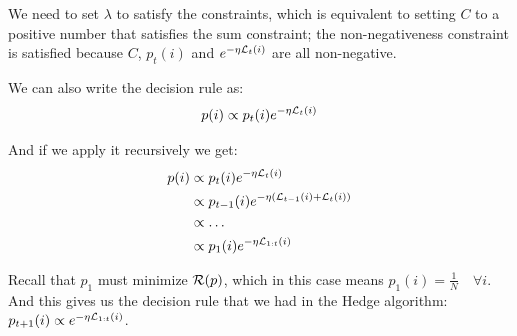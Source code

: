 \documentclass[11pt]{article}
\newtheorem{theorem}{Theorem}[section]
\newtheorem{lemma}[theorem]{Lemma}
\theoremstyle{definition}
\newtheorem{definition}[theorem]{Definition}
\theoremstyle{definition}
\newtheorem{example}[theorem]{Example}
\newcommand{\pth}[1]{\left( #1\right)}                 %
\begin{document}
We need to set $\lambda$ to satisfy the constraints, which is equivalent to setting $C$ to a positive number that satisfies the sum constraint; the non-negativeness constraint is satisfied because $C$, $p_t(i)$ and $e^{-\eta {\mathcal L}_t(i)}$ are all non-negative.

We can also write the decision rule as:
\begin{equation*}
p(i) \propto p_t(i) e^{-\eta {\mathcal L}_t(i)}
\end{equation*}

And if we apply it recursively we get:
\begin{equation*}
\begin{aligned}
p(i) &\propto p_t(i) e^{-\eta \L_t(i)}
\\
&\propto p_{t-1}(i) e^{-\eta \pth{ \L_{t-1}(i) + \L_t(i) }}
\\
&\propto \dots
\\
&\propto p_{1}(i) e^{-\eta \L_{1:t}(i)}
\end{aligned}
\end{equation*}

Recall that $p_1$ must minimize $\mathcal R(p)$, which in this case means $ p_1(i) = \frac{1}{N} \quad \forall i $. And this gives us the decision rule that we had in the Hedge algorithm: $ p_{t+1}(i) \propto e^{-\eta {\mathcal L}_{1:t}(i)} $.







%
%
%
\end{document}
